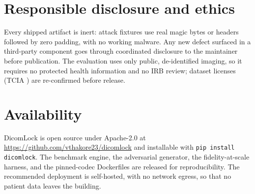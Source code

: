\documentclass[11pt]{article}
\begin{document}
\section{Responsible disclosure and ethics}

Every shipped artifact is inert: attack fixtures use real magic bytes or headers followed by zero padding, with no working malware. Any new defect surfaced in a third-party component goes through coordinated disclosure to the maintainer before publication. The evaluation uses only public, de-identified imaging, so it requires no protected health information and no IRB review; dataset licenses (TCIA \cite{ref24}) are re-confirmed before release.

\section{Availability}

DicomLock is open source under Apache-2.0 at \url{https://github.com/vthakore23/dicomlock} and installable with \texttt{pip install dicomlock}. The benchmark engine, the adversarial generator, the fidelity-at-scale harness, and the pinned-codec Dockerfiles are released for reproducibility. The recommended deployment is self-hosted, with no network egress, so that no patient data leaves the building.
\end{document}
